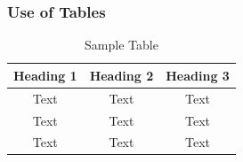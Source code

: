 \documentclass[hyperref={bookmarks=false},aspectratio=169]{beamer}
\begin{document}
\begin{frame}
  \frametitle{Use of Tables}
  \begin{table}
    \centering
    \begin{tabular}{||c|c|c||}
      \hline
      \textbf{Heading 1} & \textbf{Heading 2} & \textbf{Heading 3}\\
      \hline
      Text & Text & Text \\
      \hline
      Text & Text & Text \\
      \hline
      Text & Text & Text \\
      \hline
    \end{tabular}
    \caption{Sample Table}

  \end{table}
\end{frame}
\end{document}
